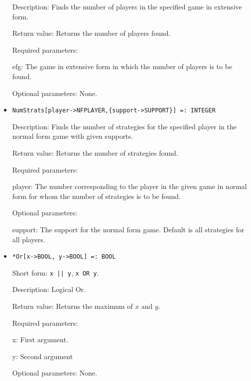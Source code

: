 \begin{itemize}
\bd
\item
[Description:] Finds the number of players in the specified game in
extensive form.
\item
[Return value:] Returns the number of players found.
\item
[Required parameters:]\hfil\null

\bd
\item
[efg:] The game in extensive form in which the number of players is
to be found.
\ed

\item   
[Optional parameters:] None.
\ed

\item
\protect \large \begin{verbatim}
NumStrats[player->NFPLAYER,{support->SUPPORT}] =: INTEGER
\end{verbatim}\normalsize

\bd

\item
[Description:] Finds the number of strategies for the specified player
in the normal form game with given supports.
\item
[Return value:] Returns the number of strategies found.
\item
[Required parameters:]\hfil\null

\bd
\item
[player:] The number corresponding to the player in the given game in
normal form for whom the number of strategies is to be found.
\ed

\item
[Optional parameters:]\hfil\null
	
\bd
\item  
[support:] The support for the normal form game.  Default is all
strategies for all players.  
\ed
\ed


\item 
\protect \large \begin{verbatim}
*Or[x->BOOL, y->BOOL] =: BOOL
\end{verbatim} \normalsize
  
\bd
\item
[Short form:] \verb+x || y+, \verb+x OR y+.
\item
[Description:] Logical Or.
\item
[Return value:] Returns the maximum of $x$ and $y$.  
\item
[Required parameters:]\hfil\null
\bd
\item
[x:] First argument.  
\item
[y:] Second argument
\ed
\item
[Optional parameters:] None.
\ed


\end{itemize}
